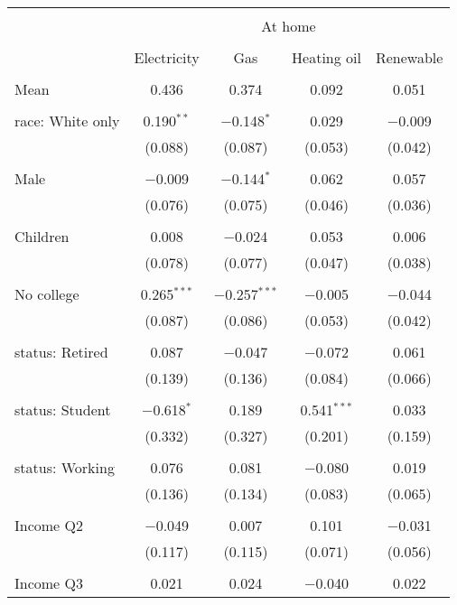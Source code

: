 
\begin{tabular}{@{\extracolsep{5pt}}lcccc} 
\\[-1.8ex]\hline 
\hline \\[-1.8ex] 
 & \multicolumn{4}{c}{At home} \\ 
\cline{2-5} 
\\[-1.8ex] & Electricity & Gas & Heating oil & Renewable \\ 
\hline \\[-1.8ex] 
 Mean & 0.436 & 0.374 & 0.092 & 0.051  \\ \hline \\[-1.8ex] race: White only & 0.190$^{**}$ & $-$0.148$^{*}$ & 0.029 & $-$0.009 \\ 
  & (0.088) & (0.087) & (0.053) & (0.042) \\ 
  & & & & \\ 
 Male & $-$0.009 & $-$0.144$^{*}$ & 0.062 & 0.057 \\ 
  & (0.076) & (0.075) & (0.046) & (0.036) \\ 
  & & & & \\ 
 Children & 0.008 & $-$0.024 & 0.053 & 0.006 \\ 
  & (0.078) & (0.077) & (0.047) & (0.038) \\ 
  & & & & \\ 
 No college & 0.265$^{***}$ & $-$0.257$^{***}$ & $-$0.005 & $-$0.044 \\ 
  & (0.087) & (0.086) & (0.053) & (0.042) \\ 
  & & & & \\ 
 status: Retired & 0.087 & $-$0.047 & $-$0.072 & 0.061 \\ 
  & (0.139) & (0.136) & (0.084) & (0.066) \\ 
  & & & & \\ 
 status: Student & $-$0.618$^{*}$ & 0.189 & 0.541$^{***}$ & 0.033 \\ 
  & (0.332) & (0.327) & (0.201) & (0.159) \\ 
  & & & & \\ 
 status: Working & 0.076 & 0.081 & $-$0.080 & 0.019 \\ 
  & (0.136) & (0.134) & (0.083) & (0.065) \\ 
  & & & & \\ 
 Income Q2 & $-$0.049 & 0.007 & 0.101 & $-$0.031 \\ 
  & (0.117) & (0.115) & (0.071) & (0.056) \\ 
  & & & & \\ 
 Income Q3 & 0.021 & 0.024 & $-$0.040 & 0.022 \\ 

\end{tabular}
